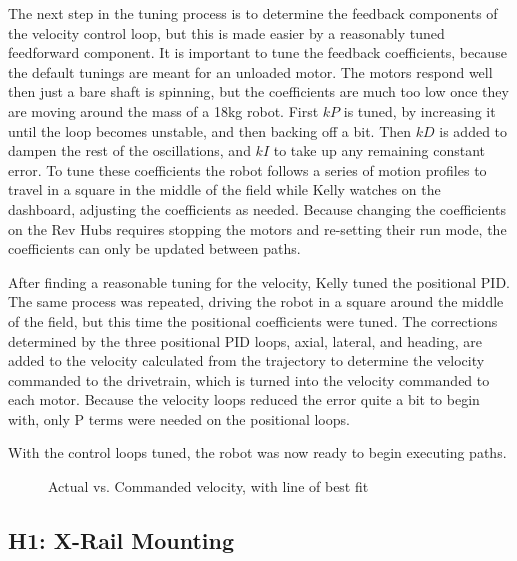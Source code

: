 \documentclass{article}
\begin{document}
The next step in the tuning process is to determine the feedback components of the velocity control loop, but this is made easier by a reasonably tuned feedforward component. It is important to tune the feedback coefficients, because the default tunings are meant for an unloaded motor. The motors respond well then just a bare shaft is spinning, but the coefficients are much too low once they are moving around the mass of a 18kg robot. First $kP$ is tuned, by increasing it until the loop becomes unstable, and then backing off a bit. Then $kD$ is added to dampen the rest of the oscillations, and $kI$ to take up any remaining constant error. To tune these coefficients the robot follows a series of motion profiles to travel in a square in the middle of the field while Kelly watches on the dashboard, adjusting the coefficients as needed. Because changing the coefficients on the Rev Hubs requires stopping the motors and re-setting their run mode, the coefficients can only be updated between paths.

After finding a reasonable tuning for the velocity, Kelly tuned the positional PID. The same process was repeated, driving the robot in a square around the middle of the field, but this time the positional coefficients were tuned. The corrections determined by the three positional PID loops, axial, lateral, and heading, are added to the velocity calculated from the trajectory to determine the velocity commanded to the drivetrain, which is turned into the velocity commanded to each motor. Because the velocity loops reduced the error quite a bit to begin with, only P terms were needed on the positional loops. 

With the control loops tuned, the robot was now ready to begin executing paths.

\begin {figure}
\centering
{}
\caption {Actual vs. Commanded velocity, with line of best fit}
\label {fig:graph}
\end{figure}
\subsection{H1: X-Rail Mounting}
\end{document}

